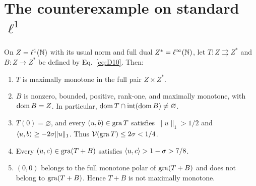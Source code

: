 \section{The counterexample on standard $\ell^1$}
\label{sec:l1}
\renewcommand{\theexample}{L}
\begin{example}\label{thm:L}
On $Z=\ell^1(\mathbb N)$ with its usual norm and full dual $Z^*=\ell^\infty(\mathbb N)$,
let $T:Z\rightrightarrows Z^*$ and $B:Z\to Z^*$ be defined by Eq.~\eqref{eq:D10}.
Then:
\begin{enumerate}
\item $T$ is maximally monotone in the full pair $Z\times Z^*$.
\item $B$ is nonzero, bounded, positive, rank-one, and maximally monotone,
with $\operatorname{dom} B=Z$. In particular,
$\operatorname{dom} T\cap\operatorname{int}(\operatorname{dom} B)\ne\varnothing$.
\item $T(0)=\varnothing$, and every $(u,b)\in\operatorname{gra} T$ satisfies
$\|u\|_1>1/2$ and $\langle u,b\rangle\ge-2\sigma\|u\|_1$.
Thus $\mathcal V(\operatorname{gra} T)\le2\sigma<1/4$.
\item Every $(u,c)\in\operatorname{gra}(T+B)$ satisfies
$\langle u,c\rangle>1-\sigma>7/8$.
\item $(0,0)$ belongs to the full monotone polar of $\operatorname{gra}(T+B)$ and does
not belong to $\operatorname{gra}(T+B)$. Hence $T+B$ is not maximally monotone.
\end{enumerate}
\end{example}
